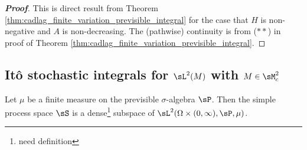 \begin{proof}[\bf Proof]
This is direct result from Theorem \ref{thm:cadlag_finite_variation_previsible_integral} for the case that $H$ is non-negative and $A$ is non-decreasing. The (pathwise) continuity is from ($**$) in proof of Theorem \ref{thm:cadlag_finite_variation_previsible_integral}.
\end{proof}

%
%
%
%



\subsection{It\^o stochastic integrals for $\sL^2(M)$ with $M\in \sM^2_c$}

\begin{proposition}\label{pro:simple_process_dense}
Let $\mu$ be a finite measure on the previsible $\sigma$-algebra $\sP$. Then the simple process space $\sS$ is a dense\footnote{need definition} subspace of $\sL^2(\Omega \times (0,\infty),\sP, \mu)$.
\end{proposition}


